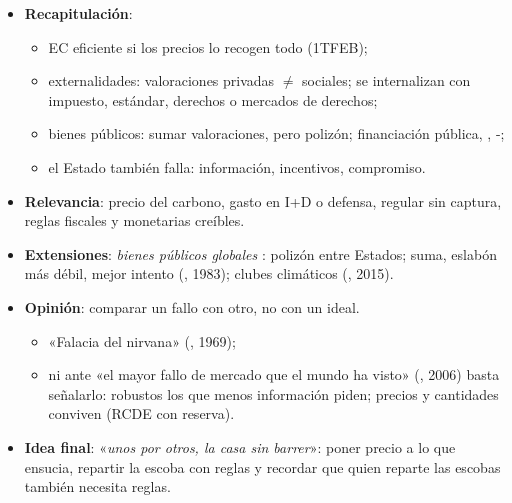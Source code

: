 \documentclass{article}
\begin{document}
\begin{columnas}
\begin{itemize}
\item \textbf{Recapitulación}:
  \begin{itemize}
  \item EC eficiente si los precios lo recogen todo (1TFEB);
  \item externalidades: valoraciones privadas $\neq$ sociales; se internalizan con impuesto, estándar, derechos o mercados de derechos;
  \item bienes públicos: sumar valoraciones, pero polizón; financiación pública, , -;
  \item el Estado también falla: información, incentivos, compromiso.
  \end{itemize}
\item \textbf{Relevancia}: precio del carbono, gasto en I+D o defensa, regular sin captura, reglas fiscales y monetarias creíbles.
\item \textbf{Extensiones}: \emph{bienes públicos globales} : polizón entre Estados; suma, eslabón más débil, mejor intento (, 1983); clubes climáticos (, 2015).
\item \textbf{Opinión}: comparar un fallo con otro, no con un ideal.
  \begin{itemize}
  \item «Falacia del nirvana» (, 1969);
  \item ni ante «el mayor fallo de mercado que el mundo ha visto» (, 2006) basta señalarlo: robustos los que menos información piden; precios y cantidades conviven (RCDE con reserva).
  \end{itemize}
\item \textbf{Idea final}: «\emph{unos por otros, la casa sin barrer}»: poner precio a lo que ensucia, repartir la escoba con reglas y recordar que quien reparte las escobas también necesita reglas.
\end{itemize}


\end{columnas}
\end{document}
